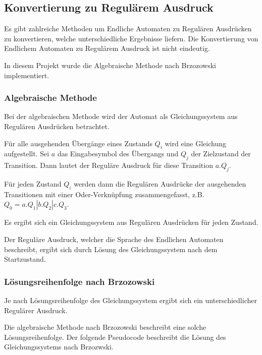 \subsection{Konvertierung zu Regulärem Ausdruck}

Es gibt zahlreiche Methoden um Endliche Automaten zu Regulären Ausdrücken zu konvertieren,
welche unterschiedliche Ergebnisse liefern. Die Konvertierung von Endlichem Automaten zu
Regulärem Ausdruck ist nicht eindeutig.

In diesem Projekt wurde die Algebraische Methode nach Brzozowski implementiert.

\subsubsection{Algebraische Methode}

Bei der algebraischen Methode wird der Automat als Gleichungssystem aus Regulären 
Ausdrücken betrachtet.

Für alle ausgehenden Übergänge eines Zustands $Q_i$ wird eine Gleichung aufgestellt.
Sei $a$ das Eingabesymbol des Übergangs und $Q_j$ der Zielzustand der Transition. Dann 
lautet der Reguläre Ausdruck für diese Transition $a.Q_j$.

Für jeden Zustand $Q_i$ werden dann die Regulären Ausdrücke der ausgehenden Transitionen
mit einer Oder-Verknüpfung zusammengefasst, z.B. $Q_0 = a.Q_1 | b.Q_2 | c.Q_3$.

Es ergibt sich ein Gleichungssystem aus Regulären Ausdrücken für jeden Zustand.

Der Reguläre Ausdruck, welcher die Sprache des Endlichen Automaten beschreibt, ergibt
sich durch Lösung des Gleichungssystem nach dem Startzustand.

\subsubsection{Lösungsreihenfolge nach Brzozowski}

Je nach Lösungsreihenfolge des Gleichungssystem ergibt sich ein unterschiedlicher
Regulärer Ausdruck.

Die algebraische Methode nach Brzozowski beschreibt eine solche Lösungsreihenfolge. Der
folgende Pseudocode beschreibt die Lösung des Gleichungssystems nach Brzozwski.

